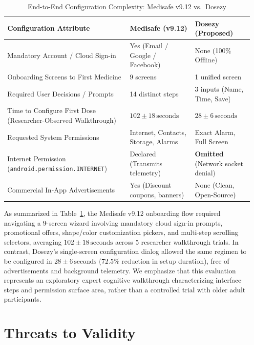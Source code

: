 \documentclass[11pt,a4paper]{article}
\begin{document}
\begin{table}[htbp]
\centering
\small
\caption{End-to-End Configuration Complexity: Medisafe v9.12 vs.\ Dosezy}
\label{tab:commercial_comparison}
\begin{tabularx}{\linewidth}{lXX}
\toprule
\textbf{Configuration Attribute} & \textbf{Medisafe (v9.12)} & \textbf{Dosezy (Proposed)} \\
\midrule
Mandatory Account / Cloud Sign-in & Yes (Email / Google / Facebook) & None (100\% Offline) \\
Onboarding Screens to First Medicine & 9 screens & 1 unified screen \\
Required User Decisions / Prompts & 14 distinct steps & 3 inputs (Name, Time, Save) \\
Time to Configure First Dose (Researcher-Observed Walkthrough) & $102 \pm 18\,\text{seconds}$ & $28 \pm 6\,\text{seconds}$ \\
Requested System Permissions & Internet, Contacts, Storage, Alarms & Exact Alarm, Full Screen \\
Internet Permission (\texttt{android.permission.INTERNET}) & Declared (Transmits telemetry) & \textbf{Omitted} (Network socket denial) \\
Commercial In-App Advertisements & Yes (Discount coupons, banners) & None (Clean, Open-Source) \\
\bottomrule
\end{tabularx}
\end{table}

As summarized in Table~\ref{tab:commercial_comparison}, the Medisafe v9.12 onboarding flow required navigating a 9-screen wizard involving mandatory cloud sign-in prompts, promotional offers, shape/color customization pickers, and multi-step scrolling selectors, averaging $102 \pm 18\,\text{seconds}$ across 5 researcher walkthrough trials. In contrast, Dosezy's single-screen configuration dialog allowed the same regimen to be configured in $28 \pm 6\,\text{seconds}$ ($72.5\%$ reduction in setup duration), free of advertisements and background telemetry. We emphasize that this evaluation represents an exploratory expert cognitive walkthrough characterizing interface steps and permission surface area, rather than a controlled trial with older adult participants.

\section{Threats to Validity}
\label{sec:threats_to_validity}
\end{document}
